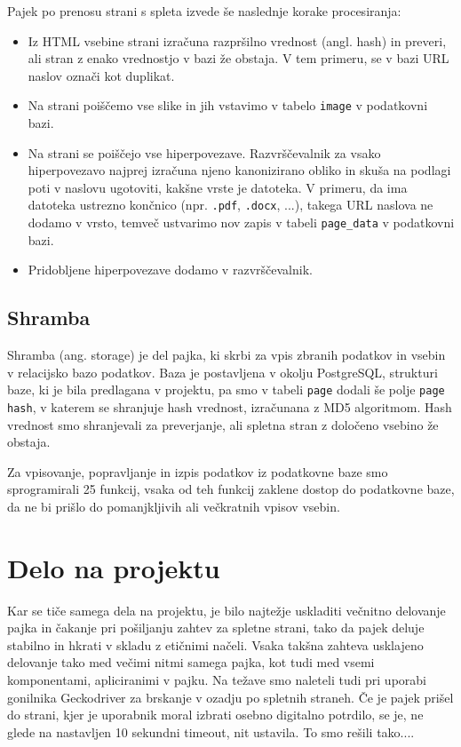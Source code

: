 \documentclass[conference]{IEEEtran}
\begin{document}
	Pajek po prenosu strani s spleta izvede še naslednje korake procesiranja:
	\begin{itemize}
		\item Iz HTML vsebine strani izračuna razpršilno vrednost (angl. hash) in preveri, ali stran z enako vrednostjo v bazi že obstaja. V tem primeru, se v bazi URL naslov označi kot duplikat.
		\item Na strani poiščemo vse slike in jih vstavimo v tabelo \texttt{image} v podatkovni bazi.
		\item Na strani se poiščejo vse hiperpovezave. Razvrščevalnik za vsako hiperpovezavo najprej izračuna njeno kanonizirano obliko in skuša na podlagi poti v naslovu ugotoviti, kakšne vrste je datoteka. V primeru, da ima datoteka ustrezno končnico (npr. \texttt{.pdf}, \texttt{.docx}, ...), takega URL naslova ne dodamo v vrsto, temveč ustvarimo nov zapis v tabeli \texttt{page\_data} v podatkovni bazi.
		\item Pridobljene hiperpovezave dodamo v razvrščevalnik.
	\end{itemize}
	
	\subsection{Shramba}
	
	Shramba (ang. storage) je del pajka, ki skrbi za vpis zbranih podatkov in vsebin v relacijsko bazo podatkov. Baza je postavljena v okolju PostgreSQL, strukturi baze, ki je bila predlagana v projektu, pa smo v tabeli \texttt{page} dodali še polje \texttt{page hash}, v katerem se shranjuje hash vrednost, izračunana z MD5 algoritmom. Hash vrednost smo shranjevali za preverjanje, ali spletna stran z določeno vsebino že obstaja. 
	
	Za vpisovanje, popravljanje in izpis podatkov iz podatkovne baze smo sprogramirali 25 funkcij, vsaka od teh funkcij zaklene dostop do podatkovne baze, da ne bi prišlo do pomanjkljivih ali večkratnih vpisov vsebin.
	
	\section{Delo na projektu}
	
	Kar se tiče samega dela na projektu, je bilo najtežje uskladiti večnitno delovanje pajka in čakanje pri pošiljanju zahtev za spletne strani, tako da pajek deluje stabilno in hkrati v skladu z etičnimi načeli. Vsaka takšna zahteva usklajeno delovanje tako med večimi nitmi samega pajka, kot tudi med vsemi komponentami, apliciranimi v pajku.
	Na težave smo naleteli tudi pri uporabi gonilnika Geckodriver za brskanje v ozadju po spletnih straneh. Če je pajek prišel do strani, kjer je uporabnik moral izbrati osebno digitalno potrdilo, se je, ne glede na nastavljen 10 sekundni timeout, nit ustavila. To smo rešili tako....
	
\end{document}
